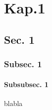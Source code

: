 \documentclass{scrbook}
\begin{document}
\chapter{Kap.1}
\section{Sec. 1}
\subsection{Subsec. 1}
\subsubsection{Subsubsec. 1}
blabla
\end{document}
